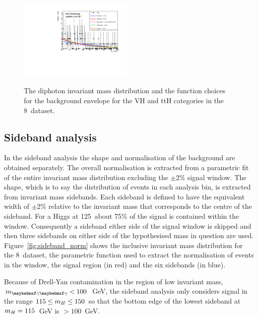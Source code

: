 \begin{figure}
  \includegraphics[width=0.49\textwidth]{analysis/plots/multipdf_plots/cat13_8TeV.pdf}\\
  \caption{The diphoton invariant mass distribution and the function choices for the background envelope for the \acs{VH} and \acs{ttH} categories in the 8~\TeV dataset.}
  \label{fig:multipdf6}
\end{figure}

\subsection{Sideband analysis}

In the sideband analysis the shape and normalisation of the background are obtained separately. The overall normalisation is extracted from a parametric fit of the entire invariant mass distribution excluding the $\pm$2\% signal window. The shape, which is to say the distribution of events in each analysis bin, is extracted from invariant mass sidebands. Each sideband is defined to have the equivalent width of $\pm$2\% relative to the invariant mass that corresponds to the centre of the sideband. For a \SM Higgs at 125~\GeV about 75\% of the signal is contained within the window. Consequently a sideband either side of the signal window is skipped and then three sidebands on either side of the hypothesised mass in question are used. Figure~\ref{fig:sideband_norm} shows the inclusive invariant mass distribution for the 8~\TeV dataset, the parametric function used to extract the normalisation of events in the window, the signal region (in red) and the six sidebands (in blue).

Because of Drell-Yan contamination in the region of low invariant mass, $\mgg<100$~GeV, the sideband analysis only considers signal in the range $115\leq m_{H} \leq 150$ so that the bottom edge of the lowest sideband at $m_{H}=115$~GeV is $>100$~GeV. 

